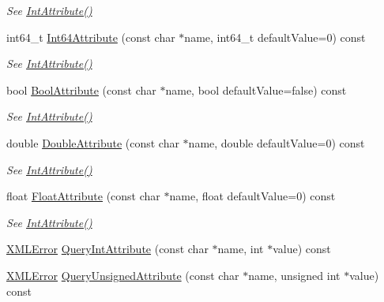 \begin{DoxyCompactItemize}
\begin{DoxyCompactList}\small\item\em See \hyperlink{classtinyxml2_1_1_x_m_l_element_a95a89b13bb14a2d4655e2b5b406c00d4}{Int\+Attribute()} \end{DoxyCompactList}\item 
int64\+\_\+t \hyperlink{classtinyxml2_1_1_x_m_l_element_a66d96972adecd816194191f13cc4a0a0}{Int64\+Attribute} (const char $\ast$name, int64\+\_\+t default\+Value=0) const
\begin{DoxyCompactList}\small\item\em See \hyperlink{classtinyxml2_1_1_x_m_l_element_a95a89b13bb14a2d4655e2b5b406c00d4}{Int\+Attribute()} \end{DoxyCompactList}\item 
bool \hyperlink{classtinyxml2_1_1_x_m_l_element_a53eda26131e1ad1031ef8ec8adb51bd8}{Bool\+Attribute} (const char $\ast$name, bool default\+Value=false) const
\begin{DoxyCompactList}\small\item\em See \hyperlink{classtinyxml2_1_1_x_m_l_element_a95a89b13bb14a2d4655e2b5b406c00d4}{Int\+Attribute()} \end{DoxyCompactList}\item 
double \hyperlink{classtinyxml2_1_1_x_m_l_element_a10a90c505aea716bf073eea1c97f33b5}{Double\+Attribute} (const char $\ast$name, double default\+Value=0) const
\begin{DoxyCompactList}\small\item\em See \hyperlink{classtinyxml2_1_1_x_m_l_element_a95a89b13bb14a2d4655e2b5b406c00d4}{Int\+Attribute()} \end{DoxyCompactList}\item 
float \hyperlink{classtinyxml2_1_1_x_m_l_element_ab1f4be2332e27dc640e9b6abd01d64dd}{Float\+Attribute} (const char $\ast$name, float default\+Value=0) const
\begin{DoxyCompactList}\small\item\em See \hyperlink{classtinyxml2_1_1_x_m_l_element_a95a89b13bb14a2d4655e2b5b406c00d4}{Int\+Attribute()} \end{DoxyCompactList}\item 
\hyperlink{namespacetinyxml2_a1fbf88509c3ac88c09117b1947414e08}{X\+M\+L\+Error} \hyperlink{classtinyxml2_1_1_x_m_l_element_a8a78bc1187c1c45ad89f2690eab567b1}{Query\+Int\+Attribute} (const char $\ast$name, int $\ast$value) const
\item 
\hyperlink{namespacetinyxml2_a1fbf88509c3ac88c09117b1947414e08}{X\+M\+L\+Error} \hyperlink{classtinyxml2_1_1_x_m_l_element_a26fc84cbfba6769dafcfbf256c05e22f}{Query\+Unsigned\+Attribute} (const char $\ast$name, unsigned int $\ast$value) const

\end{DoxyCompactItemize}
